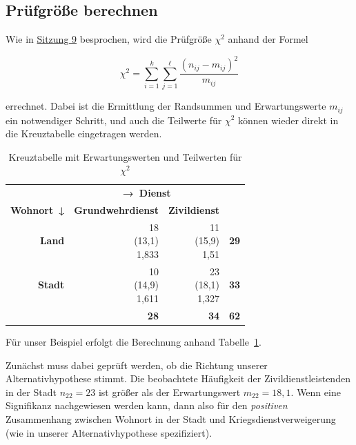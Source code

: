 \documentclass[
  11pt,
  ngerman,
  a4paper,
]{report}
\begin{document}
\hypertarget{pruxfcfgruxf6uxdfe-berechnen-4}{%
\subsection{Prüfgröße berechnen}\label{pruxfcfgruxf6uxdfe-berechnen-4}}

Wie in \protect\hyperlink{berechnung-des-kontingenzkoeffizenten-chi2}{Sitzung 9} besprochen, wird die Prüfgröße \(\chi^2\) anhand der Formel

\[
\chi^2= \sum_{i=1}^{k}\sum_{j=1}^{\ell}\frac{(n_{ij}-m_{ij})^{2}}{m_{ij}}
\label{eq:chisq}
\]

errechnet. Dabei ist die Ermittlung der Randsummen und Erwartungswerte \(m_{ij}\) ein notwendiger Schritt, und auch die Teilwerte für \(\chi^2\) können wieder direkt in die Kreuztabelle eingetragen werden.

\begin{table}

\caption{\label{tab:zivi2}Kreuztabelle mit Erwartungswerten und Teilwerten für $\chi^2$}
\centering
\begin{tabular}[t]{>{}r|r>{}r|>{}r}
\toprule
\multicolumn{1}{c}{\textbf{ }} & \multicolumn{2}{c}{\textbf{→ Dienst}} & \multicolumn{1}{c}{\textbf{ }} \\
\cmidrule(l{3pt}r{3pt}){2-3}
\textbf{Wohnort ↓} & \textbf{Grundwehrdienst} & \textbf{Zivildienst} & \textbf{  }\\
\midrule
\textbf{Land} & \makecell[tr]{18\\(13,1)\\\textcolor{goethe_blue}{1,833}} & \makecell[tr]{11\\(15,9)\\\textcolor{goethe_blue}{1,51}} & \textbf{29}\\
\textbf{Stadt} & \makecell[tr]{10\\(14,9)\\\textcolor{goethe_blue}{1,611}} & \makecell[tr]{23\\(18,1)\\\textcolor{goethe_blue}{1,327}} & \textbf{33}\\
\midrule
\textbf{\textbf{}} & \textbf{28} & \textbf{34} & \textbf{\textbf{62}}\\
\bottomrule
\end{tabular}
\end{table}

Für unser Beispiel erfolgt die Berechnung anhand Tabelle~\ref{tab:zivi2}.

Zunächst muss dabei geprüft werden, ob die Richtung unserer Alternativhypothese stimmt. Die beobachtete Häufigkeit der Zivildienstleistenden in der Stadt \(n_{22}=23\) ist größer als der Erwartungswert \(m_{22}=18{,}1\). Wenn eine Signifikanz nachgewiesen werden kann, dann also für den \emph{positiven} Zusammenhang zwischen Wohnort in der Stadt und Kriegsdienstverweigerung (wie in unserer Alternativhypothese spezifiziert).
\end{document}

